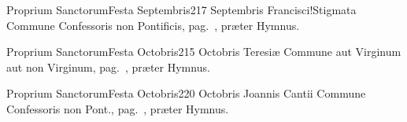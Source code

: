 \documentclass[psalterium-tridentinum.tex]{subfiles}
\begin{document}
	{Proprium Sanctorum}{Festa Septembris}{2}{17 Septembris}
	{}{}{Francisci!Stigmata}
	{Commune Confessoris non Pontificis, pag.\ \pageref{M-CONP}, præter Hymnus.}
	{}

	{Proprium Sanctorum}{Festa Octobris}{2}{15 Octobris}
	{}{}{Teresiæ}
	{Commune aut Virginum aut non Virginum, pag.\ \pageref{M-MU}, præter Hymnus.}
	{}

	{Proprium Sanctorum}{Festa Octobris}{2}{20 Octobris}
	{}{}{Joannis Cantii}
	{Commune Confessoris non Pont., pag.\ \pageref{M-CONP}, præter Hymnus.}
	{}
\end{document}
